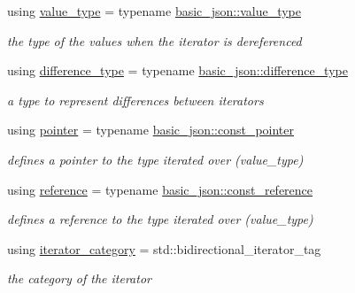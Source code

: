 \begin{DoxyCompactItemize}
using \hyperlink{classnlohmann_1_1basic__json_1_1const__iterator_a9ea0497199b1e96ce9cadd1f202ec343}{value\-\_\-type} = typename \hyperlink{classnlohmann_1_1basic__json_ac8d45b57874b4a6e9c07f7d3b5daa1f9}{basic\-\_\-json\-::value\-\_\-type}
\begin{DoxyCompactList}\small\item\em the type of the values when the iterator is dereferenced \end{DoxyCompactList}\item 
using \hyperlink{classnlohmann_1_1basic__json_1_1const__iterator_a49d7c3e9ef3280df03052cce988b792f}{difference\-\_\-type} = typename \hyperlink{classnlohmann_1_1basic__json_aec316934a555dd1acdd3600e5d4a4cdf}{basic\-\_\-json\-::difference\-\_\-type}
\begin{DoxyCompactList}\small\item\em a type to represent differences between iterators \end{DoxyCompactList}\item 
using \hyperlink{classnlohmann_1_1basic__json_1_1const__iterator_a1da96fc3054d547e7706d3a2f073f389}{pointer} = typename \hyperlink{classnlohmann_1_1basic__json_a06efb200b69942eacd1ea22d0f6ccebb}{basic\-\_\-json\-::const\-\_\-pointer}
\begin{DoxyCompactList}\small\item\em defines a pointer to the type iterated over (value\-\_\-type) \end{DoxyCompactList}\item 
using \hyperlink{classnlohmann_1_1basic__json_1_1const__iterator_aefd248cac6493eed1e6ff53ba6a63eb2}{reference} = typename \hyperlink{classnlohmann_1_1basic__json_af677a29b0e66edc9f66e5167e4667071}{basic\-\_\-json\-::const\-\_\-reference}
\begin{DoxyCompactList}\small\item\em defines a reference to the type iterated over (value\-\_\-type) \end{DoxyCompactList}\item 
using \hyperlink{classnlohmann_1_1basic__json_1_1const__iterator_a821560d64f50525162097f19b1392e7f}{iterator\-\_\-category} = std\-::bidirectional\-\_\-iterator\-\_\-tag
\begin{DoxyCompactList}\small\item\em the category of the iterator \end{DoxyCompactList}\end{DoxyCompactItemize}
